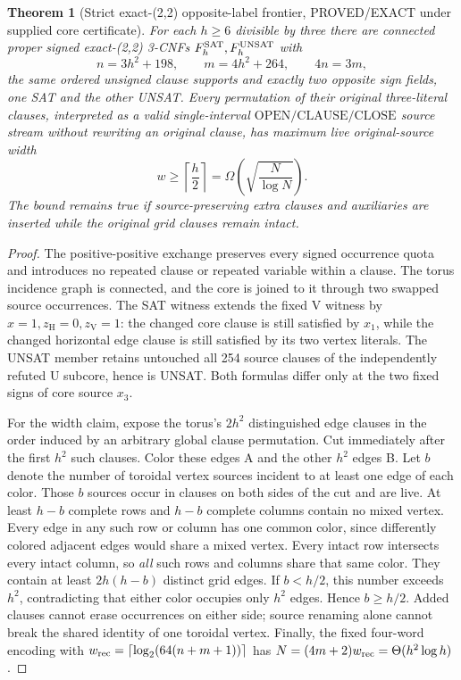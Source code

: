 \documentclass[11pt]{article}
\newtheorem{theorem}{Theorem}
\begin{document}
\begin{theorem}[Strict exact-(2,2) opposite-label frontier, PROVED/EXACT under supplied core certificate]
For each \(h\ge6\) divisible by three there are connected proper signed exact-(2,2) 3-CNFs \(F_h^{\rm SAT},F_h^{\rm UNSAT}\) with
\[
n=3h^2+198,\qquad m=4h^2+264,\qquad 4n=3m,
\]
the same ordered unsigned clause supports and exactly two opposite sign fields, one SAT and the other UNSAT. Every permutation of their original three-literal clauses, interpreted as a valid single-interval \(\mathrm{OPEN}/\mathrm{CLAUSE}/\mathrm{CLOSE}\) source stream without rewriting an original clause, has maximum live original-source width
\[
w\ge\left\lceil\frac h2\right\rceil
=\Omega\!\left(\sqrt{\frac{N}{\log N}}\right).
\]
The bound remains true if source-preserving extra clauses and auxiliaries are inserted while the original grid clauses remain intact.
\end{theorem}
\begin{proof}
The positive-positive exchange preserves every signed occurrence quota and introduces no repeated clause or repeated variable within a clause. The torus incidence graph is connected, and the core is joined to it through two swapped source occurrences. The SAT witness extends the fixed V witness by \(x=1,z_{\mathrm H}=0,z_{\mathrm V}=1\): the changed core clause is still satisfied by \(x_1\), while the changed horizontal edge clause is still satisfied by its two vertex literals. The UNSAT member retains untouched all 254 source clauses of the independently refuted U subcore, hence is UNSAT. Both formulas differ only at the two fixed signs of core source \(x_3\).

For the width claim, expose the torus's \(2h^2\) distinguished edge clauses in the order induced by an arbitrary global clause permutation. Cut immediately after the first \(h^2\) such clauses. Color these edges A and the other \(h^2\) edges B. Let \(b\) denote the number of toroidal vertex sources incident to at least one edge of each color. Those \(b\) sources occur in clauses on both sides of the cut and are live. At least \(h-b\) complete rows and \(h-b\) complete columns contain no mixed vertex. Every edge in any such row or column has one common color, since differently colored adjacent edges would share a mixed vertex. Every intact row intersects every intact column, so \emph{all} such rows and columns share that same color. They contain at least \(2h(h-b)\) distinct grid edges. If \(b<h/2\), this number exceeds \(h^2\), contradicting that either color occupies only \(h^2\) edges. Hence \(b\ge h/2\). Added clauses cannot erase occurrences on either side; source renaming alone cannot break the shared identity of one toroidal vertex. Finally, the fixed four-word encoding with
\(w_{\rm rec}=\lceil\log_2(64(n+m+1))\rceil\) has
\(N=(4m+2)w_{\rm rec}=\Theta(h^2\log h)\).
\end{proof}
\end{document}
